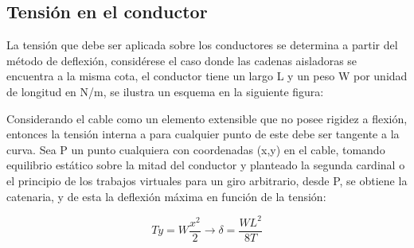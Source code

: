 

\subsection{Tensión en el conductor}\label{TensionConductor}
La tensión que debe ser aplicada sobre los conductores se determina a partir del método de deflexión, considérese el caso donde las cadenas aisladoras se encuentra a la misma cota, el conductor tiene un largo L y un peso W por unidad de longitud en N/m, se ilustra un esquema en la siguiente figura:


%


Considerando el cable como un elemento extensible que no posee rigidez a flexión,  entonces la tensión interna a para cualquier punto de este debe ser tangente a la curva. Sea P un punto cualquiera con coordenadas (x,y) en el cable, tomando equilibrio estático sobre la mitad del conductor y planteado la segunda cardinal o el principio de los trabajos virtuales para un giro arbitrario, desde P, se obtiene la catenaria, y de esta la deflexión máxima en función de la tensión:


\begin{equation}
	Ty=W\frac{x^{2}}{2} \rightarrow \delta= \frac{WL^{2}}{8T}
\end{equation}